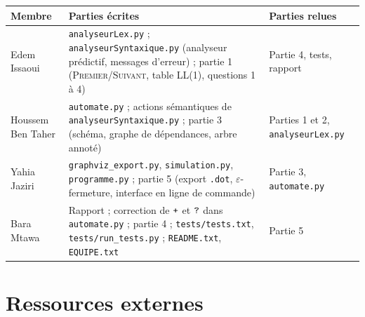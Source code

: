 \documentclass[12pt,a4paper]{article}
\newcommand{\code}[1]{{\fontsize{10}{12}\selectfont\texttt{#1}}}
\newcommand{\eps}{\ensuremath{\varepsilon}}
\newcommand{\Prem}{\textsc{Premier}}
\newcommand{\Suiv}{\textsc{Suivant}}
\newcommand{\tok}[1]{\ensuremath{\text{\fontsize{10}{12}\selectfont\ttfamily #1}}}
\begin{document}
\begin{table}[H]
\centering\small
\begin{tabularx}{\linewidth}{>{\raggedright\arraybackslash}p{3.1cm} L >{\raggedright\arraybackslash}p{3.3cm}}
\toprule
Membre & Parties écrites & Parties relues \\
\midrule
Edem Issaoui & \code{analyseurLex.py} ; \code{analyseurSyntaxique.py} (analyseur prédictif, messages d'erreur) ; partie 1 (\Prem/\Suiv, table LL(1), questions 1 à 4) & Partie 4, tests, rapport \\ \addlinespace
Houssem Ben Taher & \code{automate.py} ; actions sémantiques de \code{analyseurSyntaxique.py} ; partie 3 (schéma, graphe de dépendances, arbre annoté) & Parties 1 et 2, \code{analyseurLex.py} \\ \addlinespace
Yahia Jaziri & \code{graphviz\_export.py}, \code{simulation.py}, \code{programme.py} ; partie 5 (export \code{.dot}, \eps-fermeture, interface en ligne de commande) & Partie 3, \code{automate.py} \\ \addlinespace
Bara Mtawa & Rapport ; correction de \tok{+} et \tok{?} dans \code{automate.py} ; partie 4 ; \code{tests/tests.txt}, \code{tests/run\_tests.py} ; \code{README.txt}, \code{EQUIPE.txt} & Partie 5 \\
\bottomrule
\end{tabularx}
\end{table}

\section{Ressources externes}
\end{document}
